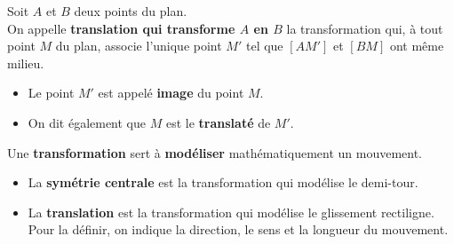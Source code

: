 \documentclass{book}
\newcommand{\defi}[1]{\textbf{\textcolor{colordef}{#1}}}
\newcommand{\pointC}[3]{\draw (#1) node[#3] {$#2$};}
\begin{document}
\begin{Df}[Translation]
Soit $A$ et $B$ deux points du plan. \\
On appelle \defi{translation qui transforme $A$ en $B$} la transformation qui, à tout point $M$ du plan, associe
l'unique point $M'$ tel que $[ AM' ]$ et $[ BM ]$ ont même milieu.
\begin{center}
\end{center}
\end{Df}

\begin{Voc}
\begin{itemize}
\item Le point $M'$ est appelé \defi{image} du point $M$.
\item On dit également que $M$ est le \defi{translaté} de $M'$.
\end{itemize}
\end{Voc}

\begin{NB}
Une \textbf{transformation} sert à \textbf{modéliser} mathématiquement un mouvement.
\begin{itemize}
\item La \textbf{symétrie centrale} est la transformation qui modélise le demi-tour. 
\item La \textbf{translation} est la transformation qui modélise le glissement rectiligne. Pour la définir, on indique la direction, le sens et la longueur du mouvement. 
\end{itemize}
\end{NB}
\end{document}
